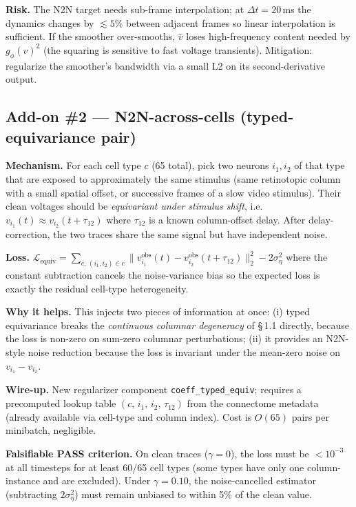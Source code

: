 \documentclass[11pt]{article}
\begin{document}
\textbf{Risk.} The N2N target needs sub-frame interpolation; at
$\Delta t = 20$\,ms the dynamics changes by $\lesssim 5\%$ between adjacent
frames so linear interpolation is sufficient. If the smoother over-smooths,
$\widehat v$ loses high-frequency content needed by $g_\phi(v)^2$ (the
squaring is sensitive to fast voltage transients). Mitigation: regularize
the smoother's bandwidth via a small L2 on its second-derivative output.

\subsection{Add-on \#2 --- N2N-across-cells (typed-equivariance pair)}

\textbf{Mechanism.} For each cell type $c$ (65 total), pick two neurons
$i_1, i_2$ of that type that are exposed to approximately the same stimulus
(same retinotopic column with a small spatial offset, or successive frames
of a slow video stimulus). Their clean voltages should be
\emph{equivariant under stimulus shift}, i.e.\ $v_{i_1}(t) \approx v_{i_2}(t + \tau_{12})$
where $\tau_{12}$ is a known column-offset delay. After delay-correction,
the two traces share the same signal but have independent noise.

\textbf{Loss.}
$\mathcal L_{\text{equiv}} = \sum_{c,\,(i_1,i_2)\in c}
\|v^{\text{obs}}_{i_1}(t) - v^{\text{obs}}_{i_2}(t + \tau_{12})\|_2^2 - 2\sigma_\eta^2$
where the constant subtraction cancels the noise-variance bias so the
expected loss is exactly the residual cell-type heterogeneity.

\textbf{Why it helps.} This injects two pieces of information at once:
(i) typed equivariance breaks the \emph{continuous columnar degeneracy} of
\S\,1.1 directly, because the loss is non-zero on sum-zero columnar
perturbations; (ii) it provides an N2N-style noise reduction because the
loss is invariant under the mean-zero noise on $v_{i_1} - v_{i_2}$.

\textbf{Wire-up.} New regularizer component
\texttt{coeff\_typed\_equiv}; requires a precomputed lookup table
$(c,\, i_1,\, i_2,\, \tau_{12})$ from the connectome metadata
(already available via cell-type and column index). Cost is
$O(65)$ pairs per minibatch, negligible.

\textbf{Falsifiable PASS criterion.} On clean traces ($\gamma=0$), the loss
must be $< 10^{-3}$ at all timesteps for at least 60/65 cell types
(some types have only one column-instance and are excluded). Under
$\gamma=0.10$, the noise-cancelled estimator (subtracting $2\sigma_\eta^2$)
must remain unbiased to within 5\% of the clean value.
\end{document}
